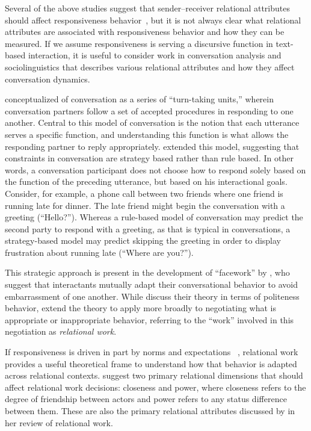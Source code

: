 \documentclass[12pt]{nuthesis}	%
\begin{document}
Several of the above studies suggest that sender--receiver relational attributes should affect responsiveness behavior~\citep[e.g.,][]{grandhi2010technology,kalman2006pauses,walther1995nonverbal,wohn2015ambient}, but it is not always clear what relational attributes are associated with responsiveness behavior and how they can be measured. If we assume responsiveness is serving a discursive function in text-based interaction, it is useful to consider work in conversation analysis and sociolinguistics that describes various relational attributes and how they affect conversation dynamics.

\citet{sacks1974simplest} conceptualized of conversation as a series of ``turn-taking units,'' wherein conversation partners follow a set of accepted procedures in responding to one another. Central to this model of conversation is the notion that each utterance serves a specific function, and understanding this function is what allows the responding partner to reply appropriately. \citet{levinson1981essential} extended this model, suggesting that constraints in conversation are strategy based rather than rule based. In other words, a conversation participant does not choose how to respond solely based on the function of the preceding utterance, but based on his interactional goals. Consider, for example, a phone call between two friends where one friend is running late for dinner. The late friend might begin the conversation with a greeting (``Hello?''). Whereas a rule-based model of conversation may predict the second party to respond with a greeting, as that is typical in conversations, a strategy-based model may predict skipping the greeting in order to display frustration about running late (``Where are you?'').

This strategic approach is present in the development of ``facework'' by \citet{brown1987politeness}, who suggest that interactants mutually adapt their conversational behavior to avoid embarrassment of one another. While \citeauthor{brown1987politeness} discuss their theory in terms of politeness behavior, \citet{locher2005politeness} extend the theory to apply more broadly to negotiating what is appropriate or inappropriate behavior, referring to the ``work'' involved in this negotiation as \textit{relational work}.

If responsiveness is driven in part by norms and expectations ~\citep[e.g.,][]{bayer2015connection, church2013s,rettie2009mobile}, relational work provides a useful theoretical frame to understand how that behavior is adapted across relational contexts. \citet{brown1987politeness} suggest two primary relational dimensions that should affect relational work decisions: closeness and power, where closeness refers to the degree of friendship between actors and power refers to any status difference between them. These are also the primary relational attributes discussed by \citet{spencer2011conceptualising} in her review of relational work.
\end{document}
